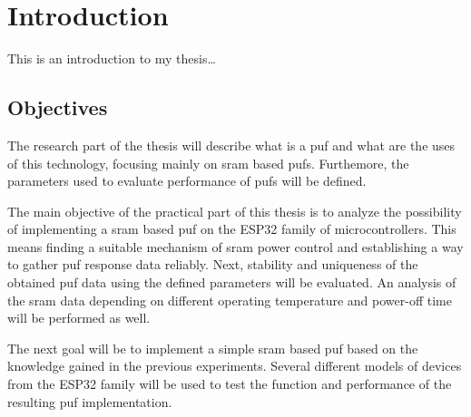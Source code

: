 \chapter{Introduction}

    This is an introduction to my thesis\ldots

\section{Objectives}

The research part of the thesis will describe what is a \gls{puf} and what are the uses of this technology, focusing mainly on \gls{sram} based \glspl{puf}. Furthemore, the parameters used to evaluate performance of \glspl{puf} will be defined.

The main objective of the practical part of this thesis is to analyze the possibility of implementing a \gls{sram} based \gls{puf} on the ESP32 family of microcontrollers. This means finding a suitable mechanism of \gls{sram} power control and establishing a way to gather \gls{puf} response data reliably. Next, stability and uniqueness of the obtained \gls{puf} data using the defined parameters will be evaluated. An analysis of the \gls{sram} data depending on different operating temperature and power-off time will be performed as well.

The next goal will be to implement a simple \gls{sram} based \gls{puf} based on the knowledge gained in the previous experiments. Several different models of devices from the ESP32 family will be used to test the function and performance of the resulting \gls{puf} implementation.\cite{Sestakova2018}

